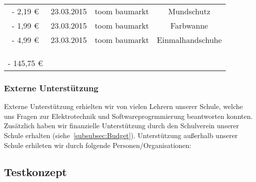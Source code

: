 \begin{table}[htbp]
\begin{tabular}{rrrr}
    \multicolumn{1}{c}{-           2,19 \euro } & 23.03.2015 & \multicolumn{1}{c}{toom baumarkt} & \multicolumn{1}{c}{Mundschutz} \\
    \multicolumn{1}{c}{-           1,99 \euro } & 23.03.2015 & \multicolumn{1}{c}{toom baumarkt} & \multicolumn{1}{c}{Farbwanne} \\
    \multicolumn{1}{c}{-           4,99 \euro } & 23.03.2015 & \multicolumn{1}{c}{toom baumarkt} & \multicolumn{1}{c}{Einmalhandschuhe} \\
    \multicolumn{1}{c}{} & \multicolumn{1}{c}{} & \multicolumn{1}{c}{} & \multicolumn{1}{c}{} \\
    \multicolumn{1}{c}{} & \multicolumn{1}{c}{} & \multicolumn{1}{c}{} & \multicolumn{1}{c}{} \\
          &       &       &  \\
    -      145,75 \euro  &       &       &  \\
    \bottomrule
    \end{tabular}%
  \label{tab:addlabel}%
\end{table}%

\subsubsection{Externe Unterstützung}
Externe Unterstützung erhielten wir von vielen Lehrern unserer Schule, welche uns Fragen zur Elektrotechnik und Softwareprogrmmierung beantworten konnten. Zusätzlich haben wir finanzielle Unterstützung durch den Schulverein unserer Schule erhalten (siehe~\ref{subsubsec:Budget}).
Unterstützung außerhalb unserer Schule erhileten wir durch folgende Personen/Organisationen:


\subsection{Testkonzept}